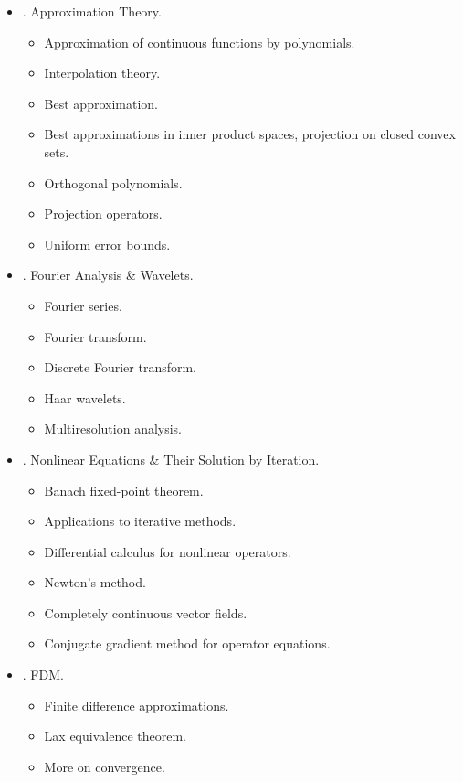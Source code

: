\documentclass{article}
\begin{document}
\begin{enumerate}
\begin{itemize}
\begin{itemize}
		\end{itemize}
		\item {. Approximation Theory.}
		\begin{itemize}
			\item {\sf Approximation of continuous functions by polynomials.}
			\item {\sf Interpolation theory.}
			\item {\sf Best approximation.}
			\item {\sf Best approximations in inner product spaces, projection on closed convex sets.}
			\item {\sf Orthogonal polynomials.}
			\item {\sf Projection operators.}
			\item {\sf Uniform error bounds.}
		\end{itemize}
		\item {. Fourier Analysis \& Wavelets.}
		\begin{itemize}
			\item {\sf Fourier series.}
			\item {\sf Fourier transform.}
			\item {\sf Discrete Fourier transform.}
			\item {\sf Haar wavelets.}
			\item {\sf Multiresolution analysis.}
		\end{itemize}
		\item {. Nonlinear Equations \& Their Solution by Iteration.}
		\begin{itemize}
			\item {\sf Banach fixed-point theorem.}
			\item {\sf Applications to iterative methods.}
			\item {\sf Differential calculus for nonlinear operators.}
			\item {\sf Newton's method.}
			\item {\sf Completely continuous vector fields.}
			\item {\sf Conjugate gradient method for operator equations.}
		\end{itemize}
		\item {. FDM.}
		\begin{itemize}
			\item {\sf Finite difference approximations.}
			\item {\sf Lax equivalence theorem.}
			\item {\sf More on convergence.}
		\end{itemize}

\end{itemize}
\end{enumerate}
\end{document}
